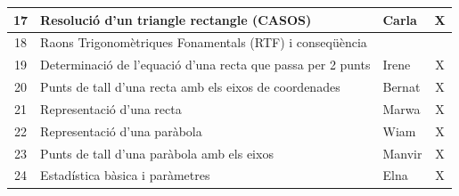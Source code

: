 \documentclass[12pt,a4paper]{article}
\begin{document}
\begin{center}
\begin{tabularx}{\textwidth}{|c|X|l|c|}
17 & Resolució d'un triangle rectangle (CASOS) & Carla & X \\ \hline
18 & Raons Trigonomètriques Fonamentals (RTF) i conseqüència & & \\ \hline
19 & Determinació de l'equació d'una recta que passa per 2 punts & Irene & X \\ \hline
20 & Punts de tall d'una recta amb els eixos de coordenades & Bernat & X \\ \hline
21 & Representació d'una recta & Marwa & X \\ \hline
22 & Representació d'una paràbola & Wiam & X \\ \hline
23 & Punts de tall d'una paràbola amb els eixos & Manvir & X \\ \hline
24 & Estadística bàsica i paràmetres & Elna & X \\ \hline
\end{tabularx}
\end{center}
\end{document}
